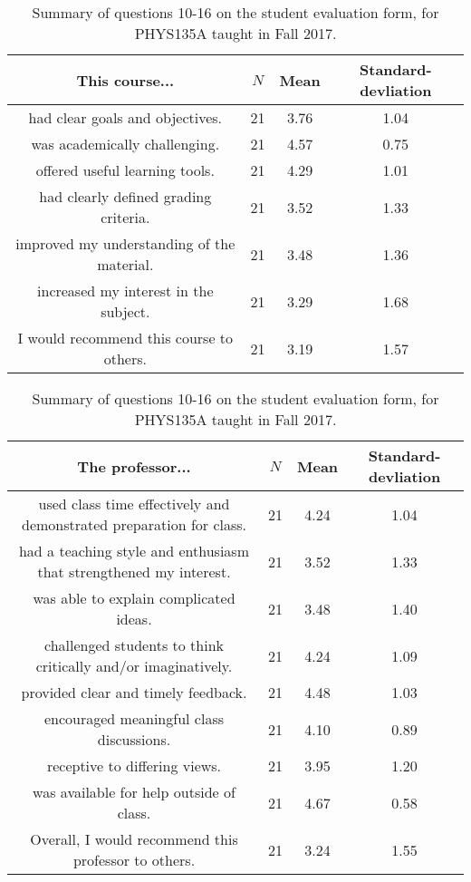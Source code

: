 \documentclass[../../main.tex]{subfiles}
\begin{document}
\begin{table}
\centering
\begin{tabular}{| c | c | c | c |}
\hline \hline
This course... & $N$ & Mean & Standard-devliation \\ \hline
had clear goals and objectives. & 21 & 3.76 & 1.04 \\ \hline
was academically challenging. & 21 & 4.57 & 0.75 \\ \hline
offered useful learning tools. & 21 & 4.29 & 1.01 \\ \hline
had clearly defined grading criteria. & 21 & 3.52 & 1.33 \\ \hline
improved my understanding of the material. & 21 & 3.48 & 1.36 \\ \hline
increased my interest in the subject. & 21 & 3.29 & 1.68 \\ \hline
I would recommend this course to others. & 21 & 3.19 & 1.57 \\ \hline
\hline
\end{tabular}
\caption{\label{tab:courses:intro_eval_1} Summary of questions 10-16 on the student evaluation form, for PHYS135A taught in Fall 2017.}
\end{table}

\begin{table}
\centering
\begin{tabular}{| c | c | c | c |}
\hline \hline
The professor... & $N$ & Mean & Standard-devliation \\ \hline
used class time effectively and demonstrated preparation for class. & 21 & 4.24 & 1.04 \\ \hline
had a teaching style and enthusiasm that strengthened my interest. & 21 & 3.52 & 1.33 \\ \hline
was able to explain complicated ideas. & 21 & 3.48 & 1.40 \\ \hline
challenged students to think critically and/or imaginatively. & 21 & 4.24 & 1.09 \\ \hline
provided clear and timely feedback. & 21 & 4.48 & 1.03 \\ \hline
encouraged meaningful class discussions. & 21 & 4.10 & 0.89 \\ \hline
receptive to differing views. & 21 & 3.95 & 1.20 \\ \hline
was available for help outside of class. & 21 & 4.67 & 0.58 \\ \hline
Overall, I would recommend this professor to others. & 21 & 3.24 & 1.55 \\ \hline
\hline
\end{tabular}
\caption{\label{tab:courses:intro_eval_2} Summary of questions 10-16 on the student evaluation form, for PHYS135A taught in Fall 2017.}
\end{table}
\end{document}
